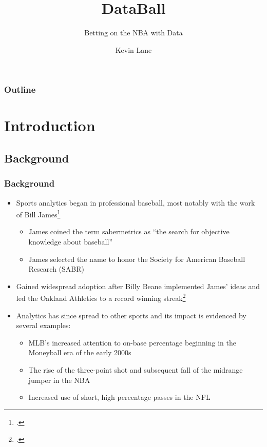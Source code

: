 \documentclass{beamer}
\title{DataBall}
\subtitle{Betting on the NBA with Data}
\author{Kevin Lane}
\begin{document}
\begin{frame}
\titlepage
\end{frame}

\begin{frame}
\frametitle{Outline}
\tableofcontents
\end{frame}

\section{Introduction}

\subsection{Background}
\begin{frame}
\frametitle{Background}
\begin{itemize}
    \item Sports analytics began in professional baseball, most notably with the work of Bill James\footcite{james}
    \begin{itemize}
        \item James coined the term sabermetrics as ``the search for objective knowledge about baseball''
        \item James selected the name to honor the Society for American Baseball Research (SABR)
    \end{itemize}
    \item Gained widespread adoption after Billy Beane implemented James' ideas and led the Oakland Athletics to a record winning streak\footcite{lewis}
    \item Analytics has since spread to other sports and its impact is evidenced by several examples:
    \begin{itemize}
        \item MLB's increased attention to on-base percentage beginning in the Moneyball era of the early 2000s
        \item The rise of the three-point shot and subsequent fall of the midrange jumper in the NBA
        \item Increased use of short, high percentage passes in the NFL
    \end{itemize}
\end{itemize}
\end{frame}
\end{document}

